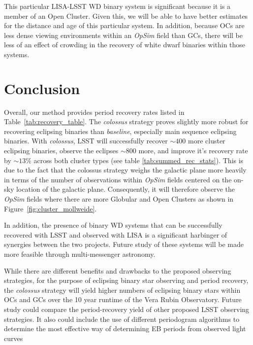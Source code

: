 \documentclass[twocolumn]{aastex63}
\begin{document}
This particular LISA-LSST WD binary system is significant because it is a member of an Open Cluster. Given this, we will be able to have better estimates for the distance and age of this particular system.  In addition, because OCs are less dense viewing environments within an \textit{OpSim} field than GCs, there will be less of an effect of crowding in the recovery of white dwarf binaries within those systems. 
\section{Conclusion}
\label{sec:Conclusion}
Overall, our method provides period recovery rates listed in Table~\ref{tab:recovery_table}. The \textit{colossus} strategy proves slightly more robust for recovering eclipsing binaries than \textit{baseline}, especially main sequence eclipsing binaries. With \textit{colossus}, LSST will successfully recover $\sim400$ more cluster eclipsing binaries, observe the eclipses $\sim800$ more, and improve it's recovery rate by $\sim13\%$ across both cluster types (see table \ref{tab:summed_rec_stats}). This is due to the fact that the colossus strategy weighs the galactic plane more heavily in terms of the number of observations within \textit{OpSim} fields centered on the on-sky location of the galactic plane. Consequently, it will therefore observe the \textit{OpSim} fields where there are more Globular and Open Clusters as shown in Figure~\ref{fig:cluster_mollweide}. 

In addition, the presence of binary WD systems that can be successfully recovered with LSST and observed with LISA is a significant harbinger of synergies between the two projects. Future study of these systems will be made more feasible through multi-messenger astronomy.

While there are different benefits and drawbacks to the proposed observing strategies, for the purpose of eclipsing binary star observing and period recovery, the \textit{colossus} strategy will yield higher numbers of eclipsing binary stars within OCs and GCs over the 10 year runtime of the Vera Rubin Observatory. Future study could compare the period-recovery yield of other proposed LSST observing strategies. It also could include the use of different periodogram algorithms to determine the most effective way of determining EB periods from observed light curves
\end{document}
